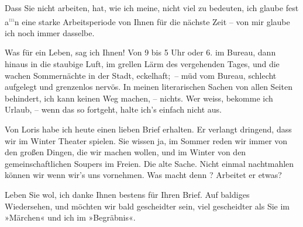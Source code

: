 \pstart
           Dass Sie nicht arbeiten, hat, wie ich meine, nicht viel zu bedeuten, ich glaube fest a\substVorne{}\textsuperscript{\textcolor{gray}{m}}\substDazwischen{}n\substHinten{} eine starke Arbeitsperiode von Ihnen für die nächste Zeit – von mir glaube
               ich noch immer dasselbe.\pend
           
\pstart
           Was für ein Leben, sag ich Ihnen! Von 9 bis 5 Uhr oder 6. im Bureau, dann hinaus in die staubige Luft,
               im grellen Lärm des vergehenden Tages, und die wachen Sommernächte in der Stadt, eckelhaft; – müd vom Bureau, schlecht aufgelegt und
               grenzenlos nervös. In meinen literarischen Sachen von {\pb}allen Seiten behindert,
               ich kann keinen Weg machen, – nichts. Wer weiss, bekomme ich Urlaub, – wenn das so
               fortgeht, halte ich’s einfach nicht aus.\pend
           
\pstart
           Von Loris habe ich heute einen lieben Brief erhalten. Er verlangt dringend, dass wir im
               Winter Theater spielen. Sie wissen ja, im Sommer reden wir immer von den großen
               Dingen, die wir machen wollen, und im Winter von den gemeinschaftlichen Soupers im
               Freien. Die alte Sache. Nicht einmal nachtmahlen können wir wenn wir’s uns
                  vornehmen.\hspace*{2.5em} Was macht denn \label{K_L03123-7v}\label{K_L03123-7}? Arbeitet er etwas?\pend
           
\pstart
           Leben Sie wol, ich danke Ihnen bestens für Ihren Brief. Auf baldiges Wiedersehen, und
               möchten wir bald gescheidter sein, viel gescheidter als Sie im »Märchen« und ich im »Begräbnis«.\pend
           

